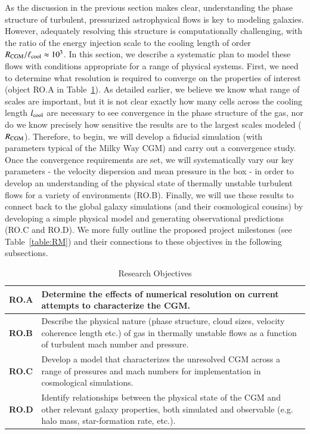 \documentclass[11pt,letterpaper,english]{article}
\begin{document}
As the discussion in the previous section makes clear, understanding the phase structure of turbulent, pressurized astrophysical flows is key to modeling galaxies. However, adequately resolving this structure is computationally challenging, with the ratio of the energy injection scale to the cooling length of order $R_{\rm CGM}/\ell_{\rm cool} \approx 10^3$.  In this section, we describe a systematic plan to model these flows with conditions appropriate for a range of physical systems. First, we need to determine what resolution is required to converge on the properties of interest (object RO.A in Table~\ref{table:RO}).  As detailed earlier, we believe we know what range of scales are important, but it is not clear exactly how many cells across the cooling length $l_{\rm cool}$ are necessary to see convergence in the phase structure of the gas, nor do we know precisely how sensitive the results are to the largest scales modeled ($R_{\rm CGM}$).  Therefore, to begin, we will develop a fiducial simulation (with parameters typical of the Milky Way CGM) and carry out a convergence study.  Once the convergence requirements are set, we will systematically vary our key parameters - the velocity dispersion and mean pressure in the box - in order to develop an understanding of the physical state of thermally unstable turbulent flows for a variety of environments (RO.B). Finally, we will use these results to connect back to the global galaxy simulations (and their cosmological cousins) by developing a simple physical model and generating observational predictions (RO.C and RO.D). We more fully outline the proposed project milestones (see Table~\ref{table:RM}) and their connections to these objectives in the following subsections.


\begin{table}[h]
\caption{Research Objectives}
\label{table:RO}
\begin{tabular}{|l|p{5.8in}|}
\hline
\textbf{RO.A} & Determine the effects of numerical resolution on current attempts to characterize the CGM. \\ \hline
\textbf{RO.B} & Describe the physical nature (phase structure, cloud sizes, velocity coherence length etc.)
of gas in thermally unstable flows as a function of turbulent mach number and pressure. \\ \hline
\textbf{RO.C} & Develop a model that characterizes the unresolved CGM across a range of
pressures and mach numbers for implementation in cosmological simulations. \\ \hline
\textbf{RO.D} & Identify relationships between the physical state of the CGM and other relevant galaxy
properties, both simulated and observable (e.g. halo mass, star-formation rate, etc.). \\
\hline
\end{tabular}
\end{table}
\end{document}
